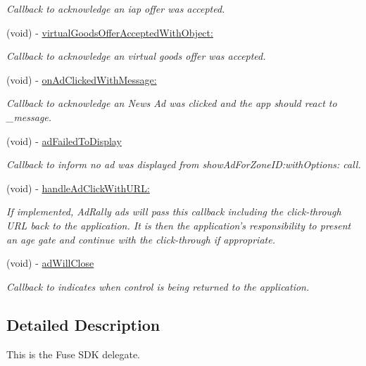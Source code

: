 \begin{DoxyCompactItemize}
\begin{DoxyCompactList}\small\item\em Callback to acknowledge an iap offer was accepted. \end{DoxyCompactList}\item 
(void) -\/ \hyperlink{protocol_fuse_delegate-p_a9577824db67c469466bd720d0193273d}{virtual\+Goods\+Offer\+Accepted\+With\+Object\+:}
\begin{DoxyCompactList}\small\item\em Callback to acknowledge an virtual goods offer was accepted. \end{DoxyCompactList}\item 
(void) -\/ \hyperlink{protocol_fuse_delegate-p_a95df901f497b5a80383dd6eb2aa9c43d}{on\+Ad\+Clicked\+With\+Message\+:}
\begin{DoxyCompactList}\small\item\em Callback to acknowledge an News Ad was clicked and the app should react to \+\_\+message. \end{DoxyCompactList}\item 
(void) -\/ \hyperlink{protocol_fuse_delegate-p_a1513d7db889fcaa54d7248f441b74072}{ad\+Failed\+To\+Display}
\begin{DoxyCompactList}\small\item\em Callback to inform no ad was displayed from show\+Ad\+For\+Zone\+I\+D\+:with\+Options\+: call. \end{DoxyCompactList}\item 
(void) -\/ \hyperlink{protocol_fuse_delegate-p_a2d725902d1f6c4c19d3ce3b65d60052b}{handle\+Ad\+Click\+With\+U\+R\+L\+:}
\begin{DoxyCompactList}\small\item\em If implemented, Ad\+Rally ads will pass this callback including the click-\/through U\+R\+L back to the application. It is then the application's responsibility to present an age gate and continue with the click-\/through if appropriate. \end{DoxyCompactList}\item 
(void) -\/ \hyperlink{protocol_fuse_delegate-p_aafc293cd46be3bd70eeb60971b961a51}{ad\+Will\+Close}
\begin{DoxyCompactList}\small\item\em Callback to indicates when control is being returned to the application. \end{DoxyCompactList}\end{DoxyCompactItemize}


\subsection{Detailed Description}
This is the Fuse S\+D\+K delegate. 

